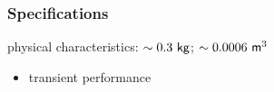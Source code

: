 \subsubsection{Specifications}
physical characteristics: $\sim 0.3 \ \mathsf{kg}$; $\sim 0.0006 \ \mathsf{m}^3$
\begin{itemize}
    \item transient performance
\end{itemize}
\begin{comment}
\subsection{Project Aim}
\begin{itemize}
    \item Ultra-capacitor charge and discharge characteristics must be well described
    \item DC-DC converter must reject ramp disturbances entering at the input voltage
    \item control loop must produce zero steady-state error from reference
    \item system must be safe under normal and extreme operating operating conditions
    \item control loop must be robust
    \item entire system must be charged/powered, and communicate through USB
\end{itemize}
\end{comment}
